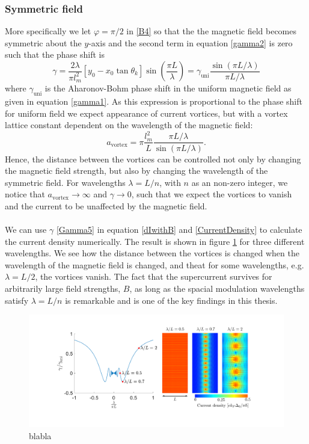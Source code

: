\subsubsection{Symmetric field}
More specifically we let $\varphi = \pi/2$ in \eqref{B4} so that the the magnetic field becomes symmetric about the $y$-axis and the second term in equation \eqref{gamma2} is zero such that the phase shift is
\begin{equation}
\gamma= \frac{2\lambda}{\pi l_m^2}\left[y_0 - x_0\tan\theta_k\right]\sin\left(\frac{\pi L}{\lambda}\right) = \gamma_{\mathrm{uni}}\frac{\sin\left(\pi L/\lambda\right)}{\pi L/\lambda}
\label{Gamma5}
\end{equation}
where $\gamma_{\mathrm{uni}}$ is the Aharonov-Bohm phase shift in the uniform magnetic field as given in equation \eqref{gamma1}. As this expression is proportional to the phase shift for uniform field we expect appearance of current vortices, but with a vortex lattice constant dependent on the wavelength of the magnetic field: 
\begin{equation}
    a_{\mathrm{vortex}} = \pi\frac{l_m^2}{L}\frac{\pi L/\lambda}{\sin(\pi L/\lambda)}.
\end{equation}
Hence, the distance between the vortices can be controlled not only by changing the magnetic field strength, but also by changing the wavelength of the symmetric field. For wavelengths $\lambda = L/n$, with $n$ as an non-zero integer, we notice that $a_{\mathrm{vortex}} \rightarrow \infty$ and $\gamma \rightarrow 0$, such that we expect the vortices to vanish and the current to be unaffected by the magnetic field.
\\
\\
We can use $\gamma$ \eqref{Gamma5} in equation \eqref{dIwithB} and \eqref{CurrentDensity} to calculate the current density numerically. The result is shown in figure \ref{fig:Dist5} for three different wavelengths. We see how the distance between the vortices is changed when the wavelength of the magnetic field is changed, and theat for some wavelengths, e.g. $\lambda = L/2$, the vortices vanish. The fact that the supercurrent survives for arbitrarily large field strengths, $B$, as long as the spacial modulation wavelengths satisfy $\lambda = L/n$ is remarkable and is one of the key findings in this thesis.
\begin{figure}[hhh]
\centering
\includegraphics[width=17cm,clip=true,trim=5cm 3cm 4.4cm 2cm]{fig/Dist5}
\caption{blabla}
\label{fig:Dist5}
\end{figure}
